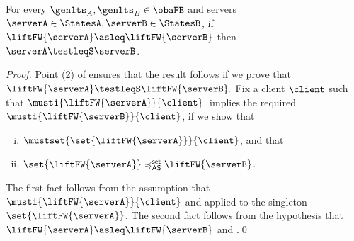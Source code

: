 \begin{proposition}[Soundness]
  \label{prop:bhv-soundness}
  For every $\genlts_A, \genlts_B \in \obaFB$ and
  servers $\serverA \in \StatesA, \serverB \in \StatesB $,
  if $\liftFW{ \serverA } \asleq \liftFW{ \serverB }$ then $\serverA \testleqS \serverB$.
\end{proposition}
\begin{proof}
Point (2) of  ensures that the result follows if we prove that
$\liftFW{\serverA} \testleqS \liftFW{\serverB}.$
Fix a client $\client$ such that $\musti{\liftFW{\serverA}}{\client}$.
 implies the required
$\musti{\liftFW{\serverB}}{\client}$, if we show that
\begin{enumerate}[(i)]
  \item $\mustset{ \set{ \liftFW{\serverA} } }{ \client }$, and that
  \item $\set{ \liftFW{ \serverA } } \mathrel{\preccurlyeq^{\mathsf{set}}_{\mathsf{AS}}} \liftFW{\serverB}$.
\end{enumerate}
The first fact follows from the assumption that $\musti{\liftFW{\serverA}}{\client}$
and  applied to the singleton
$\set{\liftFW{\serverA}}$.
The second fact follows from the hypothesis that $\liftFW{ \serverA }
\asleq \liftFW{ \serverB }$ and .\qed
\end{proof}
\clearpage

